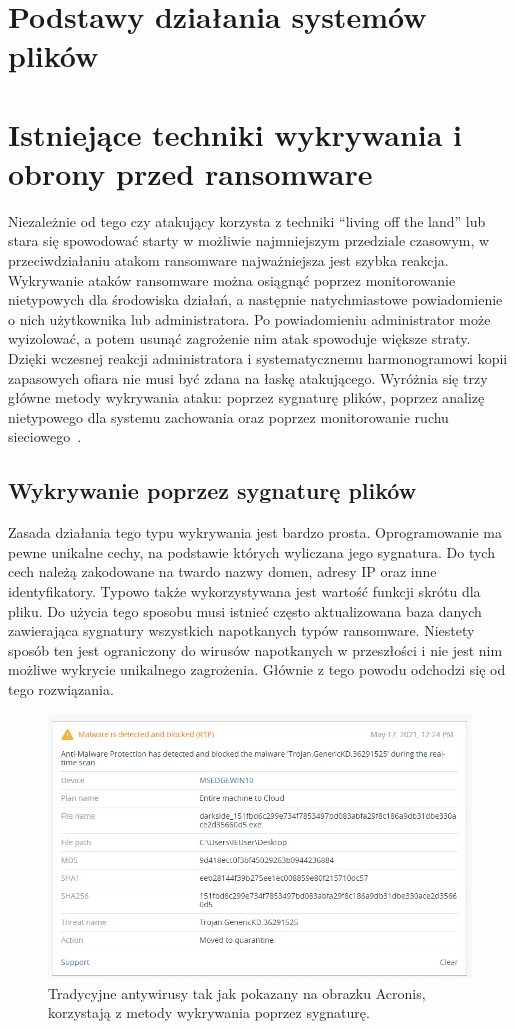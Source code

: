 \section{Podstawy działania systemów plików}
 


\section{Istniejące techniki wykrywania i obrony przed ransomware}
Niezależnie od tego czy atakujący korzysta z techniki \foreignquote{english}{living off the land} lub stara się spowodować starty w możliwie najmniejszym przedziale czasowym, w przeciwdziałaniu atakom ransomware najważniejsza jest szybka reakcja. Wykrywanie ataków ransomware można osiągnąć poprzez monitorowanie nietypowych dla środowiska działań, a następnie natychmiastowe powiadomienie o nich użytkownika lub administratora. Po powiadomieniu administrator może wyizolować, a potem usunąć zagrożenie nim atak spowoduje większe straty. Dzięki wczesnej reakcji administratora i systematycznemu harmonogramowi kopii zapasowych ofiara nie musi być zdana na łaskę atakującego.
\newline
Wyróżnia się trzy główne metody wykrywania ataku: poprzez sygnaturę plików, poprzez analizę nietypowego dla systemu zachowania oraz poprzez monitorowanie ruchu sieciowego~\cite{vehabovic_ransomware_2022}.
\subsection{Wykrywanie poprzez sygnaturę plików}
Zasada działania tego typu wykrywania jest bardzo prosta. Oprogramowanie ma pewne unikalne cechy, na podstawie których wyliczana jego sygnatura. Do tych cech należą zakodowane na twardo nazwy domen, adresy IP oraz inne identyfikatory. Typowo także wykorzystywana jest wartość funkcji skrótu dla pliku. Do użycia tego sposobu musi istnieć często aktualizowana baza danych zawierająca sygnatury wszystkich napotkanych typów ransomware. Niestety sposób ten jest ograniczony do wirusów napotkanych w przeszłości i nie jest nim możliwe wykrycie unikalnego zagrożenia. Głównie z tego powodu odchodzi się od tego rozwiązania.
\begin{figure}[H]
    \centering
    \includegraphics[width=0.75\linewidth]{rysunki/sygnatura.png}
    \caption{Tradycyjne antywirusy tak jak pokazany na obrazku Acronis, korzystają z metody wykrywania poprzez sygnaturę.}
    \label{fig:enter-label}
\end{figure}

